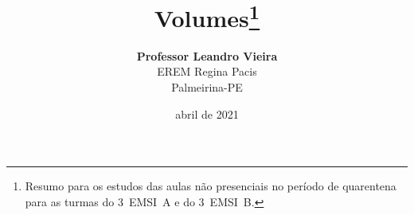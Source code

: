 \newcommand{\principal}{Volumes}
\newcommand{\conteudo}{}
\newcommand{\turmas}{3~EMSI~A e do 3~EMSI~B}

\date{abril de 2021}

\newcommand{\citacao}{Que nada nos defina. Que nada nos sujeite. Que a liberdade seja a nossa própria substância.}
\newcommand{\autorcitacao}{Simone de Beauvoir}

\usepackage[english,brazilian]{babel}
\usepackage[alf]{abntex2cite}
\usepackage[utf8]{inputenc}
\usepackage[T1]{fontenc}
\usepackage[top=15mm, bottom=15mm, left=10mm, right=10mm]{geometry}
\usepackage{framed,booktabs,color,hyperref,graphicx}
\usepackage{amsfonts,amsthm,cancel}
\usepackage{subfigure,enumerate,float}
  

\usepackage{multicol}
\columnsep=10mm %
\setlength{\columnseprule}{1pt}

\usepackage{fancyhdr}
\pagestyle{fancy}
\lhead{\textbf{\principal}}
\rhead{}
\renewcommand{\headrulewidth}{1pt} %
\renewcommand{\footrulewidth}{1pt} %

\setlength{\parindent}{1.25cm}

\newtheorem{problema}{Problema}
\newtheorem{exercicio}{exercicio}
\newtheorem{exemplo}{Exemplo}
\newtheorem{questao}{Questão}

\usepackage[skip=10pt]{caption}

\newcommand{\FRASE}{\textit{``\citacao ''}\\(\textbf{\autorcitacao})}

\title{\LINHAHORIZONTAL \\\textbf{\\ \principal}\footnote{Resumo para os estudos das aulas não presenciais no período de quarentena para as turmas do \turmas .}\\\LINHAHORIZONTAL}

\newcommand{\LINHAHORIZONTAL}{\center \rule{16cm}{1.25pt}}
\newcommand{\sol}{\textbf{Solução}}

\newcommand{\m}[1]{\(\displaystyle {#1}\)}
\newcommand{\M}[1]{\[{#1}\]}

\author{\textbf{Professor Leandro Vieira}\\EREM Regina Pacis\\Palmeirina-PE}
\newcommand{\frase}{\begin{verse} \flushright{\FRASE} \end{verse}}
